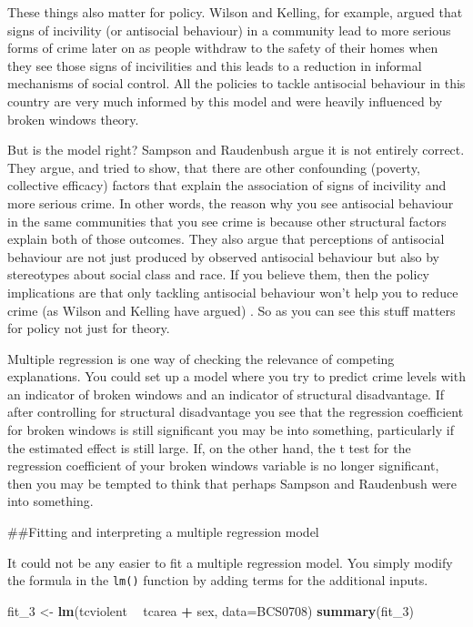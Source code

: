 \documentclass[]{book}
\newenvironment{Shaded}{\begin{snugshade}}{\end{snugshade}}
\newcommand{\DataTypeTok}[1]{\textcolor[rgb]{0.13,0.29,0.53}{#1}}
\newcommand{\DecValTok}[1]{\textcolor[rgb]{0.00,0.00,0.81}{#1}}
\newcommand{\KeywordTok}[1]{\textcolor[rgb]{0.13,0.29,0.53}{\textbf{#1}}}
\newcommand{\NormalTok}[1]{#1}
\newcommand{\OperatorTok}[1]{\textcolor[rgb]{0.81,0.36,0.00}{\textbf{#1}}}
\newcommand{\StringTok}[1]{\textcolor[rgb]{0.31,0.60,0.02}{#1}}
\theoremstyle{definition}
\theoremstyle{definition}
\theoremstyle{definition}
\theoremstyle{remark}
\begin{document}
These things also matter for policy. Wilson and Kelling, for example,
argued that signs of incivility (or antisocial behaviour) in a community
lead to more serious forms of crime later on as people withdraw to the
safety of their homes when they see those signs of incivilities and this
leads to a reduction in informal mechanisms of social control. All the
policies to tackle antisocial behaviour in this country are very much
informed by this model and were heavily influenced by broken windows
theory.

But is the model right? Sampson and Raudenbush argue it is not entirely
correct. They argue, and tried to show, that there are other confounding
(poverty, collective efficacy) factors that explain the association of
signs of incivility and more serious crime. In other words, the reason
why you see antisocial behaviour in the same communities that you see
crime is because other structural factors explain both of those
outcomes. They also argue that perceptions of antisocial behaviour are
not just produced by observed antisocial behaviour but also by
stereotypes about social class and race. If you believe them, then the
policy implications are that only tackling antisocial behaviour won't
help you to reduce crime (as Wilson and Kelling have argued) . So as you
can see this stuff matters for policy not just for theory.

Multiple regression is one way of checking the relevance of competing
explanations. You could set up a model where you try to predict crime
levels with an indicator of broken windows and an indicator of
structural disadvantage. If after controlling for structural
disadvantage you see that the regression coefficient for broken windows
is still significant you may be into something, particularly if the
estimated effect is still large. If, on the other hand, the t test for
the regression coefficient of your broken windows variable is no longer
significant, then you may be tempted to think that perhaps Sampson and
Raudenbush were into something.

\#\#Fitting and interpreting a multiple regression model

It could not be any easier to fit a multiple regression model. You
simply modify the formula in the \texttt{lm()} function by adding terms
for the additional inputs.

\begin{Shaded}
\begin{Highlighting}[]
\NormalTok{fit_}\DecValTok{3}\NormalTok{ <-}\StringTok{ }\KeywordTok{lm}\NormalTok{(tcviolent }\OperatorTok{~}\StringTok{ }\NormalTok{tcarea }\OperatorTok{+}\StringTok{ }\NormalTok{sex, }\DataTypeTok{data=}\NormalTok{BCS0708)}
\KeywordTok{summary}\NormalTok{(fit_}\DecValTok{3}\NormalTok{)}
\end{Highlighting}
\end{Shaded}
\end{document}
